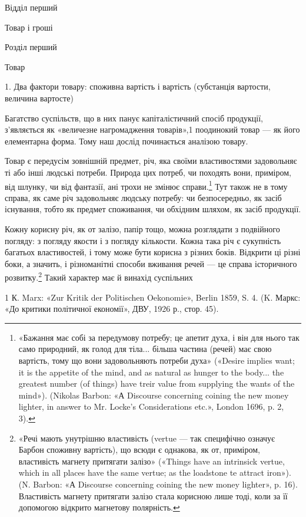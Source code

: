 Відділ перший

Товар і гроші

Розділ перший

Товар

1. Два фактори товару: споживна вартість і вартість (субстанція
вартости, величина вартосте)

Багатство суспільств, що в них панує капіталістичний спосіб
продукції, з’являється як «величезне нагромадження товарів»,1
поодинокий товар — як його елементарна форма. Тому наш
дослід починається аналізою товару.

Товар є передусім зовнішній предмет, річ, яка своїми властивостями
задовольняє ті або інші людські потреби. Природа цих
потреб, чи походять вони, приміром, від шлунку, чи від фантазії,
ані трохи не змінює справи.\footnote{
«Бажання має собі за передумову потребу; це апетит духа, і він
для нього так само природний, як голод для тіла... більша частина (речей)
має свою вартість, тому що вони задовольняють потреби духа» («Desire
implies want; it is the appetite of the mind, and as natural as hunger to
the body... the greatest number (of things) have treir value from supplying
the wants of the mind»). (Nikolas Barbon: «А Discourse concerning coining
the new money lighter, in answer to Mr. Locke’s Considerations
etc.», London 1696, p. 2, 3).
} Тут також не в тому справа, як саме
річ задовольняє людську потребу: чи безпосередньо, як засіб
існування, тобто як предмет споживання, чи обхідним шляхом,
як засіб продукції.

Кожну корисну річ, як от залізо, папір тощо, можна розглядати
з подвійного погляду: з погляду якости і з погляду кількости.
Кожна така річ є сукупність багатьох властивостей, і тому
може бути корисна з різних боків. Відкрити ці різні боки, а значить,
і різноманітні способи вживання речей — це справа історичного
розвитку.\footnote{
«Речі мають унутрішню властивість (vertue — так специфічно
означує Барбон споживну вартість), що всюди є однакова, як от, приміром,
властивість магнету притягати залізо» («Things have an intrinsick vertue,
which in all places have the same vertue; as the loadstone te attract iron»).
(N. Barbon: «А Discourse concerning coining the new money lighter»,
p. 16). Властивість магнету притягати залізо стала корисною лише тоді,
коли за її допомогою відкрито магнетову полярність.
} Такий характер має й винахід суспільних

1    К. Marx: «Zur Kritik der Politischen Oekonomie», Berlin 1859,
S. 4. (K. Маркс: «До критики політичної економії», ДВУ, 1926 р.,
стор. 45).
\parbreak{}  %
